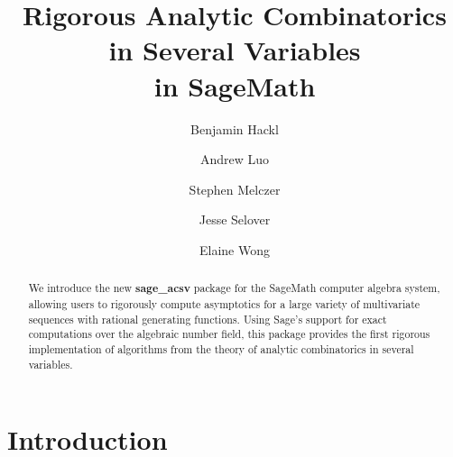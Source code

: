 \documentclass[a4paper]{amsart}
\theoremstyle{definition}
\begin{document}
\title[Rigorous ACSV in SageMath]{Rigorous Analytic Combinatorics in Several Variables\\ in SageMath}

\author[B. Hackl]{Benjamin Hackl}
  \address{
    Department of Mathematics, University of Klagenfurt, Austria}

\author[A. Luo]{Andrew Luo}
  \address{Department of Combinatorics and Optimization, University of Waterloo, Canada}

\author[S. Melczer]{Stephen Melczer}
  \address{Department of Combinatorics and Optimization, University of Waterloo, Canada}

\author[J. Selover]{Jesse Selover}
  \address{Department of Mathematics, University of Massachusetts, Amherst, USA}

\author[E. Wong]{Elaine Wong}
  \address{Oak Ridge National Laboratory, Tennessee, USA}
  
\begin{abstract}
We introduce the new \textbf{sage\_acsv} package for the SageMath computer algebra system, allowing users to rigorously compute asymptotics for a large variety of multivariate sequences with rational generating functions. Using Sage's support for exact computations over the algebraic number field, this package provides the first rigorous implementation of algorithms from the theory of analytic combinatorics in several variables.
\end{abstract}

\maketitle

\section{Introduction}
\end{document}
